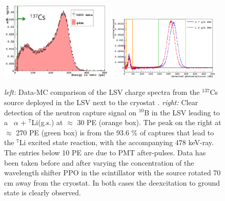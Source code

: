 \begin{figure}[htbp]
\centering
\includegraphics[width=0.48\textwidth]{./Figures/137Cs_Veto_Paolo_G4DS_UCLA.png}
\includegraphics[width=0.48\textwidth]{./Figures/AmBe_LSV_VetoPaper.png}
\caption{\textit{left:} Data-MC comparison of the LSV charge spectra from the $^{137}$Cs source deployed in the LSV next to the cryostat \cite{DS50:G4DS:paper}.
\textit{right:} Clear detection of the neutron capture signal on $^{10}$B in the LSV leading to a \enbortengroundalpha\ $\alpha$ + $^7$Li(g.s.) at $\approx$ 30 PE (orange box). The
peak on the right at $\approx$ 270 PE (green box) is from the 93.6 \% of captures that lead to the $^7$Li excited state reaction, with the accompanying 478 keV-ray. The entries below 10 PE are due to PMT after-pulses. Data has been taken before and after varying the concentration of the wavelength shifter PPO in the scintillator with the source rotated 70 cm away from the cryostat. In both cases the deexcitation to ground state is clearly observed.\cite{DS50:VetoPaper}
\label{fig:LSV:Calib}} 
\end{figure}

